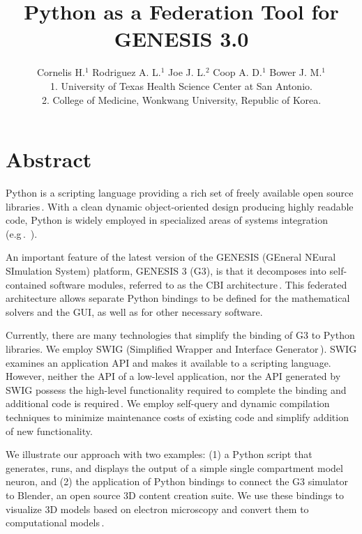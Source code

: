 \documentclass[12pt]{article}
\begin{document}
\title{Python as a Federation Tool for GENESIS 3.0}

\author{Cornelis H.$^1$ Rodriguez A. L.$^1$ Joe J. L.$^2$ Coop A. D.$^1$ Bower J. M.$^1$\\
  {\small 1. University of Texas Health Science Center at San Antonio.} \\
  {\small 2. College of Medicine, Wonkwang University, Republic of Korea.}
}

\maketitle
{}
\section*{Abstract}
Python is a scripting language providing a rich set of freely
available open source
libraries\,\cite{langtangen04:_python_scrip_comput_scien}. With a
clean dynamic object-oriented design producing highly readable code,
Python is widely employed in specialized areas of systems integration
(e.g\,.~\cite{thiruvathukal01:_web_progr_python}).

An important feature of the latest version of the GENESIS (GEneral
NEural SImulation System) platform, GENESIS 3 (G3), is that it
decomposes into self-contained software modules, referred to as the
CBI architecture\,\cite{cornelis08:_cbi_archit_comput_simul_realis}.
This federated architecture allows separate Python bindings to be
defined for the mathematical solvers and the GUI, as well as for other
necessary software.

Currently, there are many technologies that simplify the binding of G3
to Python libraries.  We employ SWIG (Simplified Wrapper and Interface
Generator\,\cite{08:_simpl_wrapp_inter_gener}).  SWIG examines an
application API and makes it available to a scripting language.
However, neither the API of a low-level application, nor the API
generated by SWIG possess the high-level functionality required to
complete the binding and additional code is
required\,\cite{08:_swig_python}. We employ self-query and dynamic
compilation techniques to minimize maintenance costs of existing code
and simplify addition of new functionality.

We illustrate our approach with two examples: (1) a Python script that
generates, runs, and displays the output of a simple single
compartment model neuron, and (2) the application of Python bindings
to connect the G3 simulator to Blender, an open source 3D content
creation suite.  We use these bindings to visualize 3D models based on
electron microscopy and convert them to computational
models\,\cite{cornelis08:_model_neuros_genes}.
\end{document}
